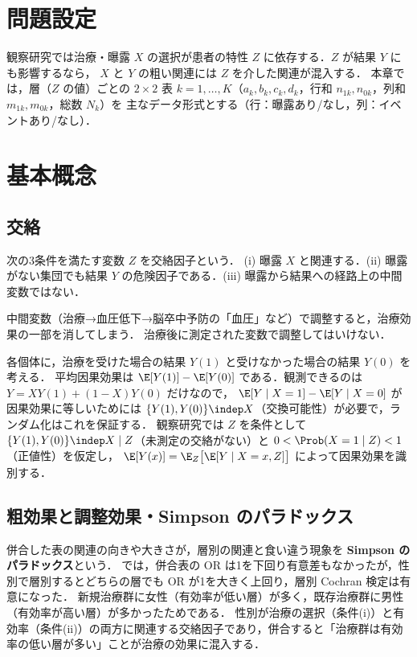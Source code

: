 \section{問題設定}\label{sec:07-setting}
観察研究では治療・曝露 $X$ の選択が患者の特性 $Z$ に依存する．$Z$ が結果 $Y$ にも影響するなら，
$X$ と $Y$ の粗い関連には $Z$ を介した関連が混入する．
本章では，層（$Z$ の値）ごとの $2\times2$ 表 $k=1,\dots,K$（$a_k,b_k,c_k,d_k$，行和 $n_{1k},n_{0k}$，列和 $m_{1k},m_{0k}$，総数 $N_k$）を
主なデータ形式とする（行：曝露あり/なし，列：イベントあり/なし）．

\section{基本概念}\label{sec:07-basic}
\subsection{交絡}\label{subsec:07-confound}
\begin{teigi}[交絡因子]\label{def:07-confounder}
次の3条件を満たす変数 $Z$ を交絡因子という．
(i) 曝露 $X$ と関連する．(ii) 曝露がない集団でも結果 $Y$ の危険因子である．(iii) 曝露から結果への経路上の中間変数ではない．
\end{teigi}
\Youchui 中間変数（治療→血圧低下→脳卒中予防の「血圧」など）で調整すると，治療効果の一部を消してしまう．
治療後に測定された変数で調整してはいけない．

\begin{supbox}[補足：潜在結果による定式化]
各個体に，治療を受けた場合の結果 $Y(1)$ と受けなかった場合の結果 $Y(0)$ を考える．
平均因果効果は $\E[Y(1)]-\E[Y(0)]$ である．観測できるのは $Y=XY(1)+(1-X)Y(0)$ だけなので，
$\E[Y\mid X=1]-\E[Y\mid X=0]$ が因果効果に等しいためには $\{Y(1),Y(0)\}\indep X$（交換可能性）が必要で，ランダム化はこれを保証する．
観察研究では $Z$ を条件として $\{Y(1),Y(0)\}\indep X\mid Z$（未測定の交絡がない）と $0<\Prob(X=1\mid Z)<1$（正値性）を仮定し，
$\E[Y(x)]=\E_Z\bigl[\E[Y\mid X=x,Z]\bigr]$ によって因果効果を識別する．
\end{supbox}

\subsection{粗効果と調整効果・Simpson のパラドックス}\label{subsec:07-simpson}
\Hinshutsu 併合した表の関連の向きや大きさが，層別の関連と食い違う現象を \textbf{Simpson のパラドックス}という．
 では，併合表の OR は1を下回り有意差もなかったが，性別で層別するとどちらの層でも OR が1を大きく上回り，層別 Cochran 検定は有意になった．
新規治療群に女性（有効率が低い層）が多く，既存治療群に男性（有効率が高い層）が多かったためである．
性別が治療の選択（条件(i)）と有効率（条件(ii)）の両方に関連する交絡因子であり，併合すると「治療群は有効率の低い層が多い」ことが治療の効果に混入する．

